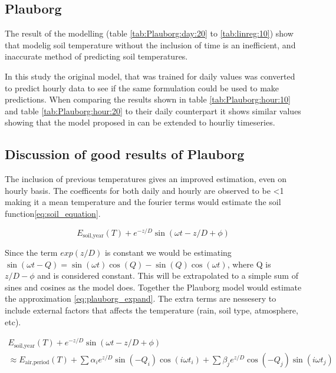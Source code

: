 \subsection{Plauborg}

The result of the modelling (table \ref{tab:Plauborg:day:20} to \ref{tab:linreg:10}) show that modelig soil temperature without the inclusion of time is an inefficient, and inaccurate method of predicting soil temperatures.

In this study the original model, that was trained for daily values was converted to predict hourly data to see if the same formulation could be used to make predictions. When comparing the results shown in table \ref{tab:Plauborg:hour:10} and table \ref{tab:Plauborg:hour:20} to their daily counterpart it shows similar values showing that the model proposed in \citeauthor{plauborg_simple_2002} can be extended to hourliy timeseries.

\subsection{Discussion of good results of Plauborg}

The inclusion of previous temperatures gives an improved estimation, even on hourly basis. The coefficents for both daily and hourly are observed to be <1 making it a mean temperature and the fourier terms would estimate the soil function\eqref{eq:soil_equation}\cite{holmes_estimating_2008}.

\begin{equation}
E_{\text{soil,year}}(T) + e^{-z/D}\sin(\omega t - z/D + \phi)\label{eq:soil_equation}
\end{equation}

Since the term $exp(z/D)$ is constant we would be estimating $\sin(\omega t - Q) = \sin(\omega t)\cos(Q) - \sin(Q)\cos(\omega t)$, where Q is $z/D - \phi$ and is considered constant. This will be extrapolated to a simple sum of sines and cosines as the model does. Together the Plauborg model would estimate the approximation \eqref{eq:plauborg_expand}. The extra terms are nessesery to include external factors that affects the temperature (rain, soil type, atmosphere, etc). 

\begin{align}
E_{\text{soil,year}}(T) + e^{-z/D}\sin(\omega t - z/D + \phi) \\
\approx E_{\text{air,period}}(T) + \sum \alpha_ie^{z/D}\sin(-Q_i)\cos(i\omega t_i) + \sum \beta_je^{z/D}\cos(-Q_j)\sin(i\omega t_j)\label{eq:plauborg_expand}
\end{align}

